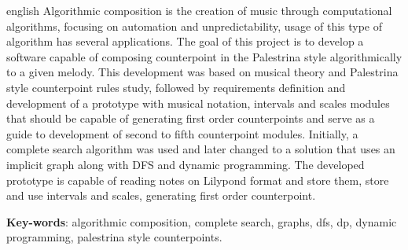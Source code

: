 \begin{resumo}[Abstract]
 \begin{otherlanguage*}{english}
   Algorithmic composition is the creation of music through computational algorithms, focusing on automation and unpredictability, usage of this type of algorithm has several applications. The goal of this project is to develop a software capable of composing counterpoint in the Palestrina style algorithmically to a given melody. This development was based on musical theory and Palestrina style counterpoint rules study, followed by requirements definition and development of a prototype with musical notation, intervals and scales modules that should be capable of generating first order counterpoints and serve as a guide to development of second to fifth counterpoint modules. Initially, a complete search algorithm was used and later changed to a solution that uses an implicit graph along with DFS and dynamic programming. The developed prototype is capable of reading notes on Lilypond format and store them, store and use intervals and scales, generating first order counterpoint.

   \vspace{\onelineskip}

   \noindent
   \textbf{Key-words}: algorithmic composition, complete search, graphs, dfs, dp, dynamic programming, palestrina style counterpoints.
 \end{otherlanguage*}
\end{resumo}
